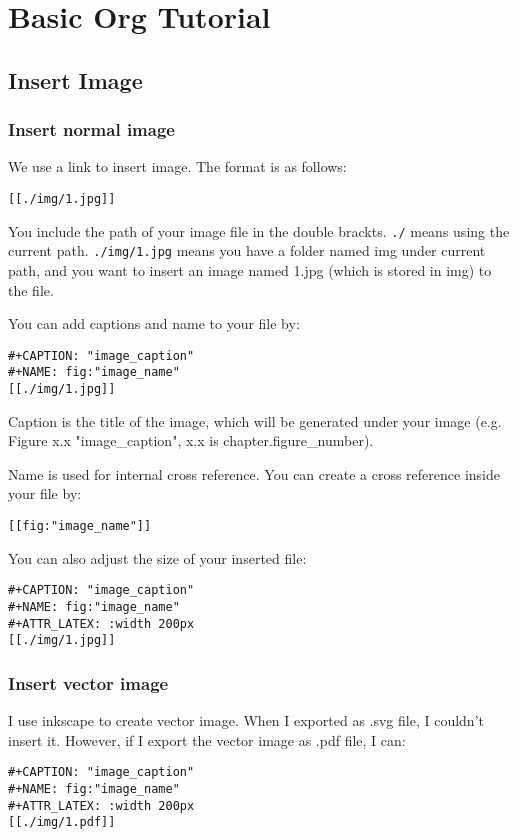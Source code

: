\documentclass[12pt]{book}
\date{\today}
\title{}
\begin{document}
\tableofcontents

\part{Basic Org Tutorial}
\label{sec:orgce3b29e}
\chapter{Insert Image}
\label{sec:orgb0b1285}
\section{Insert normal image}
\label{sec:org27a202a}
We use a link to insert image. The format is as follows:
\begin{verbatim}
[[./img/1.jpg]]
\end{verbatim}

You include the path of your image file in the double brackts. \texttt{./} means using the current path. \texttt{./img/1.jpg} means you have a folder named img under current path, and you want to insert an image named 1.jpg (which is stored in img) to the file.

You can add captions and name to your file by:
\begin{verbatim}
#+CAPTION: "image_caption"
#+NAME: fig:"image_name"
[[./img/1.jpg]]
\end{verbatim}

Caption is the title of the image, which will be generated under your image (e.g. Figure x.x "image\_caption", x.x is chapter.figure\_number).

Name is used for internal cross reference. You can create a cross reference inside your file by:
\begin{verbatim}
[[fig:"image_name"]]
\end{verbatim}

You can also adjust the size of your inserted file:
\begin{verbatim}
#+CAPTION: "image_caption"
#+NAME: fig:"image_name"
#+ATTR_LATEX: :width 200px
[[./img/1.jpg]]
\end{verbatim}


\section{Insert vector image}
\label{sec:org300ca35}
I use inkscape to create vector image. When I exported as .svg file, I couldn't insert it. However, if I export the vector image as .pdf file, I can:
\begin{verbatim}
#+CAPTION: "image_caption"
#+NAME: fig:"image_name"
#+ATTR_LATEX: :width 200px
[[./img/1.pdf]]
\end{verbatim}
\end{document}
